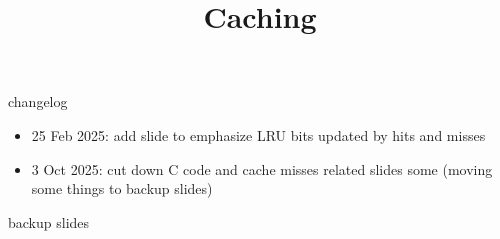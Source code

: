 \graphicspath{{./figures/}}
\title{Caching}
\date{}





{\changelogmode
\begin{frame}{changelog}
\begin{itemize}
\item 25 Feb 2025: add slide to emphasize LRU bits updated by hits and misses
\item 3 Oct 2025: cut down C code and cache misses related slides some (moving some things to backup slides)
\end{itemize}
\end{frame}
}



\begin{frame}{backup slides}
\end{frame}




